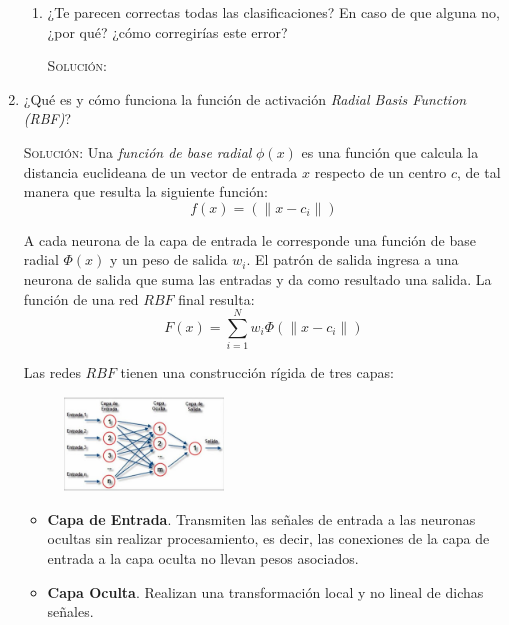 \documentclass[letterpaper,11pt]{article}
\begin{document}
\begin{enumerate}
\begin{enumerate}
        \item ¿Te parecen correctas todas las clasificaciones? En caso de que 
        alguna no, ¿por qué? ¿cómo corregirías este error?

        \textsc{Solución:} 
    \end{enumerate}

    \item ¿Qué es y cómo funciona la función de activación \textit{Radial Basis
    Function (RBF)}?

    \textsc{Solución:} Una \textit{función de base radial} $\phi(x)$ es una 
    función que calcula la distancia euclideana de un vector de entrada $x$
    respecto de un centro $c$, de tal manera que resulta la siguiente función:
    \begin{equation*}
        f(x) = (\| x - c_i\|)
    \end{equation*}

    A cada neurona de la capa de entrada le corresponde una función de base 
    radial $\Phi (x)$ y un peso de salida $w_i$. El patrón de salida ingresa a
    una neurona de salida que suma las entradas y da como resultado una salida.
    La función de una red $RBF$ final resulta:
    \begin{equation*}
        F(x) = \sum^N_{i=1} w_{i} \Phi (\| x - c_{i} \|)
    \end{equation*} 

    Las redes $RBF$ tienen una construcción rígida de tres capas:
    \begin{figure}[ht]
        \centering
        \includegraphics[width=0.4\textwidth]{./imagenes/rbf.png}
    \end{figure}  

    \begin{itemize}
        \item \textbf{Capa de Entrada}. Transmiten las señales de entrada a las 
        neuronas ocultas sin realizar procesamiento, es decir, las conexiones de 
        la capa de entrada a la capa oculta no llevan pesos asociados. 

        \item \textbf{Capa Oculta}. Realizan una transformación local y no lineal 
        de dichas señales.


\end{itemize}
\end{enumerate}
\end{document}
